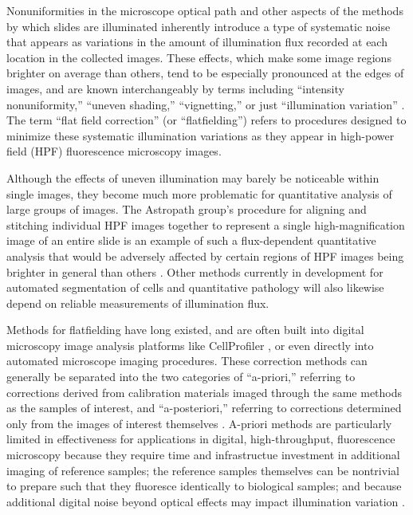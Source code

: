 \documentclass[letterpaper,11pt]{article}
\begin{document}
Nonuniformities in the microscope optical path and other aspects of the methods by which slides are illuminated inherently introduce a type of systematic noise that appears as variations in the amount of illumination flux recorded at each location in the collected images. These effects, which make some image regions brighter on average than others, tend to be especially pronounced at the edges of images, and are known interchangeably by terms including ``intensity nonuniformity,'' ``uneven shading,'' ``vignetting,'' or just ``illumination variation'' \cite{doi:10.1111/jmi.12178}. The term ``flat field correction'' (or ``flatfielding'') refers to procedures designed to minimize these systematic illumination variations as they appear in high-power field (HPF) fluorescence microscopy images. 

Although the effects of uneven illumination may barely be noticeable within single images, they become much more problematic for quantitative analysis of large groups of images. The Astropath group's procedure for aligning and stitching individual HPF images together to represent a single high-magnification image of an entire slide is an example of such a flux-dependent quantitative analysis that would be adversely affected by certain regions of HPF images being brighter in general than others \cite{Heshy}. Other methods currently in development for automated segmentation of cells and quantitative pathology will also likewise depend on reliable measurements of illumination flux.

Methods for flatfielding have long existed, and are often built into digital microscopy image analysis platforms like CellProfiler \cite{Carpenter2006}, or even directly into automated microscope imaging procedures. These correction methods can generally be separated into the two categories of ``a-priori,'' referring to corrections derived from calibration materials imaged through the same methods as the samples of interest, and ``a-posteriori,'' referring to corrections determined only from the images of interest themselves \cite{18770694}. A-priori methods are particularly limited in effectiveness for applications in digital, high-throughput, fluorescence microscopy because they require time and infrastructue investment in additional imaging of reference samples; the reference samples themselves can be nontrivial to prepare such that they fluoresce identically to biological samples; and because additional digital noise beyond optical effects may impact illumination variation \cite{doi:10.1111/jmi.12178}.
\end{document}
